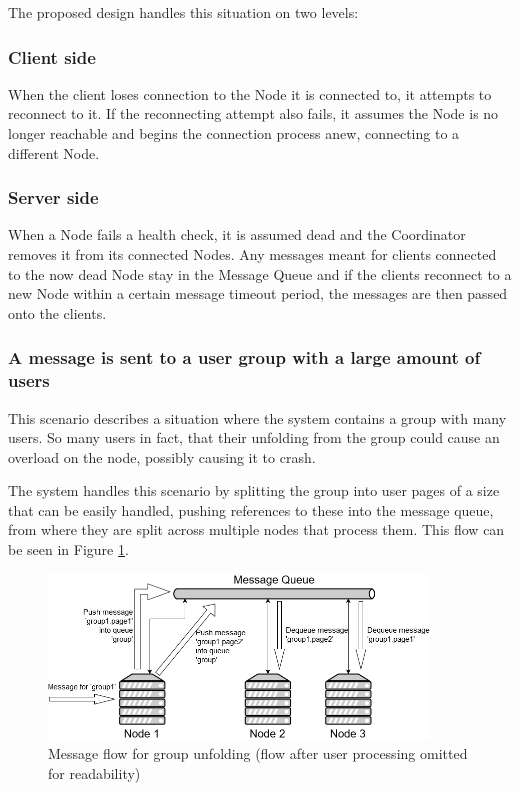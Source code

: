 The proposed design handles this situation on two levels:
\subsubsection*{Client side}
When the client loses connection to the Node it is connected to, it attempts to reconnect to it. If the reconnecting attempt also fails, it assumes the Node is no longer reachable and begins the connection process anew, connecting to a different Node.

\subsubsection*{Server side}
When a Node fails a health check, it is assumed dead and the Coordinator removes it from its connected Nodes. Any messages meant for clients connected to the now dead Node stay in the Message Queue and if the clients reconnect to a new Node within a certain message timeout period, the messages are then passed onto the clients.

\subsubsection{A message is sent to a user group with a large amount of users}
This scenario describes a situation where the system contains a group with many users. So many users in fact, that their unfolding from the group could cause an overload on the node, possibly causing it to crash.

The system handles this scenario by splitting the group into user pages of a size that can be easily handled, pushing references to these into the message queue, from where they are split across multiple nodes that process them. This flow can be seen in Figure \ref{fig:mq-group}.

\begin{figure}[!ht]
	\centering
	\includegraphics[width=0.9\textwidth]{figures/03_design/mq-group}
    \caption{Message flow for group unfolding (flow after user processing omitted for readability)}
    \label{fig:mq-group}
\end{figure}

